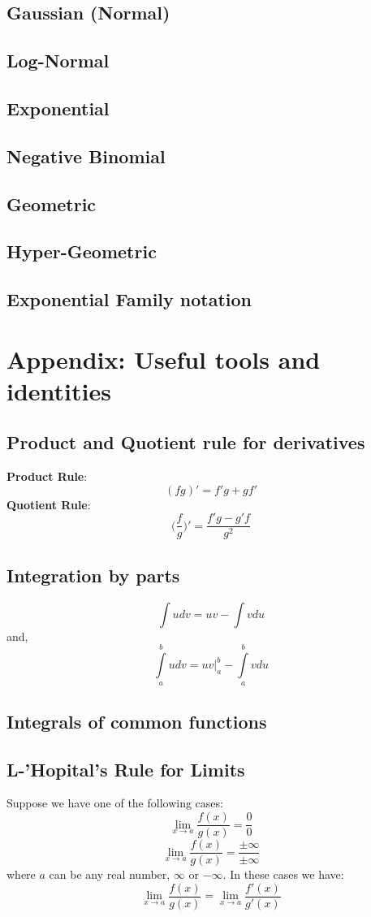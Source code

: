 \documentclass[english, 11pt]{article}
\begin{document}
\subsection{Gaussian (Normal)}
\subsection{Log-Normal}
\subsection{Exponential}
\subsection{Negative Binomial}
\subsection{Geometric}
\subsection{Hyper-Geometric}
\subsection{Exponential Family notation}

\newpage

\section{Appendix: Useful tools and identities}
\subsection{Product and Quotient rule for derivatives}
{\bf Product Rule}:
\[ (fg)' = f'g + gf' \]
{\bf Quotient Rule}:
\[ \bigg( \frac{f}{g} \bigg)' = \frac{f'g - g'f}{g^2} \]

\subsection{Integration by parts}
\[ \int u dv = uv - \int v du \]
and,
\[ \int\limits_{a}^{b} u dv = uv \bigg|_{a}^{b} - \int\limits_{a}^{b} v du \]

\subsection{Integrals of common functions}
\subsection{L-'Hopital's Rule for Limits}
Suppose we have one of the following cases:\\
\[ \lim_{x \to a} \frac{f(x)}{g(x)} = \frac{0}{0} \]
\[ \lim_{x \to a} \frac{f(x)}{g(x)} = \frac{\pm \infty}{\pm \infty} \]
where $a$ can be any real number, $\infty$ or $-\infty$. In these cases we have:
\[ \lim_{x \to a} \frac{f(x)}{g(x)} = \lim_{x \to a} \frac{f'(x)}{g'(x)} \]
\end{document}
